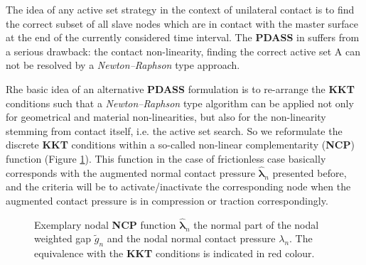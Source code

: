 \documentclass[a4paper,10pt]{article} %
\begin{document}
The idea of any active set strategy in the context of unilateral contact is to find the correct subset of all slave nodes which are in contact with the master surface at the end of the currently considered time interval. The \textbf{PDASS} in  suffers from a serious drawback: the contact non-linearity, finding the correct active set A can not be resolved by a \textit{Newton–Raphson} type approach. 

Rhe basic idea of an alternative \textbf{PDASS} formulation is to re-arrange the \textbf{KKT} conditions such that a \textit{Newton–Raphson} type algorithm can be applied not only for geometrical and material non-linearities, but also for the non-linearity stemming from contact itself, i.e. the active set search. So we reformulate the discrete \textbf{KKT} conditions within a so-called non-linear complementarity (\textbf{NCP}) function (Figure \ref{fig:ncp}). This function in the case of frictionless case basically corresponds with the augmented normal contact pressure $\hat{\boldsymbol{\lambda}}_n$ presented before, and the criteria will be to activate/inactivate the corresponding node when the augmented contact pressure is in compression or traction correspondingly. 

\begin{figure}[h]
\begin{center}
\caption{Exemplary nodal \textbf{NCP} function $\hat{\boldsymbol{\lambda}}_n$ the normal part of the nodal weighted
gap $\tilde{g}_n$ and the nodal normal contact pressure $\lambda_n$. The equivalence with the \textbf{KKT} conditions is indicated in red colour.
}
\label{fig:ncp}
\end{center}
\end{figure}
\end{document}

